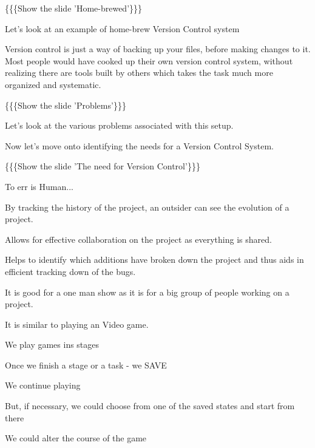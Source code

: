\documentclass[a4paper,english]{article}
\begin{document}
\{\{\{Show the slide 'Home-brewed'\}\}\}


Let's look at an example of home-brew Version Control system

Version control is just a way of backing up your files, before making changes to it. Most people would have cooked up their own version control system, without realizing there are tools built by others which takes the task much more organized and systematic.


\{\{\{Show the slide 'Problems'\}\}\}

Let's look at the various problems associated with this setup.


Now let's move onto identifying the needs for a Version Control System.


\{\{\{Show the slide 'The need for Version Control'\}\}\}

\setcounter{listcnt0}{0}
\begin{list}{.}
{
\setlength{\rightmargin}{\leftmargin}
}

\item To err is Human...

\item By tracking the history of the project, an outsider can see the evolution of a project.

\item Allows for effective collaboration on the project as everything is shared.

\item Helps to identify which additions have broken down the project and thus aids in efficient tracking down of the bugs.

\item It is good for a one man show as it is for a big group of people working on a project.
\end{list}


It is similar to playing an Video game.
\setcounter{listcnt0}{0}
\begin{list}{.}
{
\setlength{\rightmargin}{\leftmargin}
}

\item We play games ins stages

\item Once we finish a stage or a task - we SAVE

\item We continue playing

\item But, if necessary, we could choose from one of the saved states and start from there

\item We could alter the course of the game
\end{list}
\end{document}
